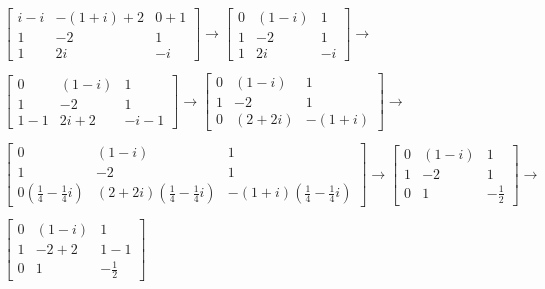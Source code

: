 \documentclass[12pt]{article}
\begin{document}
\begin{enumerate}
      \begin{align*}
        \begin{bmatrix}
          i - i & -(1 + i) + 2 & 0 + 1\\
          1 &     -2   &  1\\
          1 &     2i   & -i
        \end{bmatrix}
        \xrightarrow{}
        \begin{bmatrix}
          0 & (1 - i)  &  1\\
          1 &     -2   &  1\\
          1 &     2i   & -i
        \end{bmatrix}
        \xrightarrow{}\\\\
        \begin{bmatrix}
          0 & (1 - i)  &  1\\
          1 &     -2   &  1\\
          1 - 1 & 2i + 2   & -i - 1
        \end{bmatrix}
        \xrightarrow{}
        \begin{bmatrix}
          0 & (1 - i)  &  1\\
          1 &     -2   &  1\\
          0 & (2 + 2i) & -(1 + i)
        \end{bmatrix}
        \xrightarrow{}\\\\
        \begin{bmatrix}
          0 & (1 - i)  &  1\\
          1 &     -2   &  1\\
          0(\frac{1}{4} - \frac{1}{4}i) & (2 + 2i)(\frac{1}{4} - \frac{1}{4}i) & -(1 + i)(\frac{1}{4} - \frac{1}{4}i)
        \end{bmatrix}
        \xrightarrow{}
        \begin{bmatrix}
          0 & (1 - i)  &  1\\
          1 &     -2   &  1\\
          0 & 1 & -\frac{1}{2}
        \end{bmatrix}
        \xrightarrow{}\\\\
        \begin{bmatrix}
          0 & (1 - i) &  1\\
          1 & -2 + 2  &  1 - 1\\
          0 & 1 & -\frac{1}{2}
        \end{bmatrix}

\end{align*}
\end{enumerate}
\end{document}
